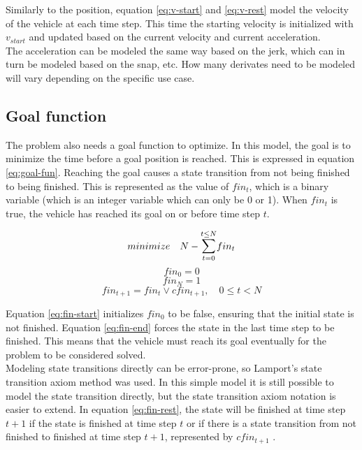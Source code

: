 Similarly to the position, equation \ref{eq:v-start} and \ref{eq:v-rest} model the velocity of the vehicle at each time step. This time the starting velocity is initialized with $v_{start}$ and updated based on the current velocity and current acceleration.\\
The acceleration can be modeled the same way based on the jerk, which can in turn be modeled based on the snap, etc. How many derivates need to be modeled will vary depending on the specific use case.

\subsection{Goal function}
The problem also needs a goal function to optimize. In this model, the goal is to minimize the time before a goal position is reached. This is expressed in equation \ref{eq:goal-fun}. Reaching the goal causes a state transition from not being finished to being finished. This is represented as the value of $fin_t$, which is a binary variable (which is an integer variable which can only be 0 or 1). When $fin_t$ is true, the vehicle has reached its goal on or before time step $t$.

\begin{equation}
\label{eq:goal-fun}
minimize \quad N - \mathlarger{\sum}_{t=0}^{t \leq N} fin_t
\end{equation}
\begin{equation}
\label{eq:fin-start}
fin_0 = 0
\end{equation}
\begin{equation}
\label{eq:fin-end}
fin_{N} = 1
\end{equation}
\begin{equation}
\label{eq:fin-rest}
fin_{t+1} = fin_t \vee cfin_{t+1},  \quad 0 \leq t < N
\end{equation}

Equation \ref{eq:fin-start} initializes $fin_0$ to be false, ensuring that the initial state is not finished. Equation \ref{eq:fin-end} forces the state in the last time step to be finished. This means that the vehicle must reach its goal eventually for the problem to be considered solved. \\
Modeling state transitions directly can be error-prone, so Lamport's \cite{Lamport1989} state transition axiom method was used. In this simple model it is still possible to model the state transition directly, but the state transition axiom notation is easier to extend. In equation \ref{eq:fin-rest}, the state will be finished at time step $t+1$ if the state is finished at time step $t$ or if there is a state transition from not finished to finished at time step $t + 1$, represented by $cfin_{t+1}$ .

